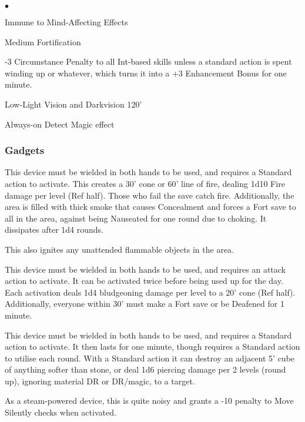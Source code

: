 
\begin{list}{$\bullet$}{\itemspace}
\item Immune to Mind-Affecting Effects
\item Medium Fortification
\item -3 Circumstance Penalty to all Int-based skills unless a standard action is spent winding up or whatever, which turns it into a +3 Enhancement Bonus for one minute.
\item Low-Light Vision and Darkvision 120'
\item Always-on Detect Magic effect
\end{list}



\subsubsection{Gadgets}

{This device must be wielded in both hands to be used, and requires a Standard action to activate. This creates a 30' cone or 60' line of fire, dealing 1d10 Fire damage per level (Ref half). Those who fail the save catch fire. Additionally, the area is filled with thick smoke that causes Concealment and forces a Fort save to all in the area, against being Nauseated for one round due to choking. It dissipates after 1d4 rounds.\medskip

\noindent This also ignites any unattended flammable objects in the area.}

{This device must be wielded in both hands to be used, and requires an attack action to activate. It can be activated twice before being used up for the day. Each activation deals 1d4 bludgeoning damage per level to a 20' cone (Ref half). Additionally, everyone within 30' must make a Fort save or be Deafened for 1 minute.}

{This device must be wielded in both hands to be used, and requires a Standard action to activate. It then lasts for one minute, though requires a Standard action to utilise each round. With a Standard action it can destroy an adjacent 5' cube of anything softer than stone, or deal 1d6 piercing damage per 2 levels (round up), ignoring material DR or DR/magic, to a target.\medskip

\noindent As a steam-powered device, this is quite noisy and grants a -10 penalty to Move Silently checks when activated.}

